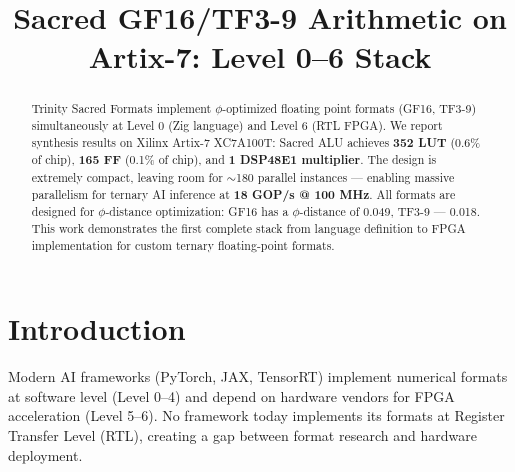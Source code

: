 \documentclass[10pt,conference]{IEEEtran}
\begin{document}

\title{Sacred GF16/TF3-9 Arithmetic on Artix-7: Level 0–6 Stack}

\author{
}

\maketitle


\begin{abstract}
Trinity Sacred Formats implement $\phi$-optimized floating point formats (GF16, TF3-9) simultaneously at Level 0 (Zig language) and Level 6 (RTL FPGA). We report synthesis results on Xilinx Artix-7 XC7A100T: Sacred ALU achieves \textbf{352 LUT} (0.6\% of chip), \textbf{165 FF} (0.1\% of chip), and \textbf{1 DSP48E1 multiplier}. The design is extremely compact, leaving room for $\sim$180 parallel instances — enabling massive parallelism for ternary AI inference at \textbf{18 GOP/s @ 100 MHz}. All formats are designed for $\phi$-distance optimization: GF16 has a $\phi$-distance of 0.049, TF3-9 — 0.018. This work demonstrates the first complete stack from language definition to FPGA implementation for custom ternary floating-point formats.
\end{abstract}


\section{Introduction}

Modern AI frameworks (PyTorch, JAX, TensorRT) implement numerical formats at software level (Level 0--4) and depend on hardware vendors for FPGA acceleration (Level 5--6). No framework today implements its formats at Register Transfer Level (RTL), creating a gap between format research and hardware deployment.
\end{document}

